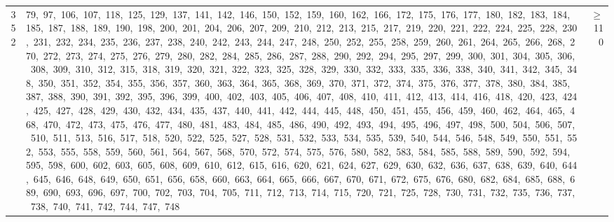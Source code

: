 \begin{longtable}{c|p{}|r}
352 & 79,\ 97,\ 106,\ 107,\ 118,\ 125,\ 129,\ 137,\ 141,\ 142,\ 146,\ 150,\ 152,\ 159,\ 160,\ 162,\ 166,\ 172,\ 175,\ 176,\ 177,\ 180,\ 182,\ 183,\ 184,\ 185,\ 187,\ 188,\ 189,\ 190,\ 198,\ 200,\ 201,\ 204,\ 206,\ 207,\ 209,\ 210,\ 212,\ 213,\ 215,\ 217,\ 219,\ 220,\ 221,\ 222,\ 224,\ 225,\ 228,\ 230,\ 231,\ 232,\ 234,\ 235,\ 236,\ 237,\ 238,\ 240,\ 242,\ 243,\ 244,\ 247,\ 248,\ 250,\ 252,\ 255,\ 258,\ 259,\ 260,\ 261,\ 264,\ 265,\ 266,\ 268,\ 270,\ 272,\ 273,\ 274,\ 275,\ 276,\ 279,\ 280,\ 282,\ 284,\ 285,\ 286,\ 287,\ 288,\ 290,\ 292,\ 294,\ 295,\ 297,\ 299,\ 300,\ 301,\ 304,\ 305,\ 306,\ 308,\ 309,\ 310,\ 312,\ 315,\ 318,\ 319,\ 320,\ 321,\ 322,\ 323,\ 325,\ 328,\ 329,\ 330,\ 332,\ 333,\ 335,\ 336,\ 338,\ 340,\ 341,\ 342,\ 345,\ 348,\ 350,\ 351,\ 352,\ 354,\ 355,\ 356,\ 357,\ 360,\ 363,\ 364,\ 365,\ 368,\ 369,\ 370,\ 371,\ 372,\ 374,\ 375,\ 376,\ 377,\ 378,\ 380,\ 384,\ 385,\ 387,\ 388,\ 390,\ 391,\ 392,\ 395,\ 396,\ 399,\ 400,\ 402,\ 403,\ 405,\ 406,\ 407,\ 408,\ 410,\ 411,\ 412,\ 413,\ 414,\ 416,\ 418,\ 420,\ 423,\ 424,\ 425,\ 427,\ 428,\ 429,\ 430,\ 432,\ 434,\ 435,\ 437,\ 440,\ 441,\ 442,\ 444,\ 445,\ 448,\ 450,\ 451,\ 455,\ 456,\ 459,\ 460,\ 462,\ 464,\ 465,\ 468,\ 470,\ 472,\ 473,\ 475,\ 476,\ 477,\ 480,\ 481,\ 483,\ 484,\ 485,\ 486,\ 490,\ 492,\ 493,\ 494,\ 495,\ 496,\ 497,\ 498,\ 500,\ 504,\ 506,\ 507,\ 510,\ 511,\ 513,\ 516,\ 517,\ 518,\ 520,\ 522,\ 525,\ 527,\ 528,\ 531,\ 532,\ 533,\ 534,\ 535,\ 539,\ 540,\ 544,\ 546,\ 548,\ 549,\ 550,\ 551,\ 552,\ 553,\ 555,\ 558,\ 559,\ 560,\ 561,\ 564,\ 567,\ 568,\ 570,\ 572,\ 574,\ 575,\ 576,\ 580,\ 582,\ 583,\ 584,\ 585,\ 588,\ 589,\ 590,\ 592,\ 594,\ 595,\ 598,\ 600,\ 602,\ 603,\ 605,\ 608,\ 609,\ 610,\ 612,\ 615,\ 616,\ 620,\ 621,\ 624,\ 627,\ 629,\ 630,\ 632,\ 636,\ 637,\ 638,\ 639,\ 640,\ 644,\ 645,\ 646,\ 648,\ 649,\ 650,\ 651,\ 656,\ 658,\ 660,\ 663,\ 664,\ 665,\ 666,\ 667,\ 670,\ 671,\ 672,\ 675,\ 676,\ 680,\ 682,\ 684,\ 685,\ 688,\ 689,\ 690,\ 693,\ 696,\ 697,\ 700,\ 702,\ 703,\ 704,\ 705,\ 711,\ 712,\ 713,\ 714,\ 715,\ 720,\ 721,\ 725,\ 728,\ 730,\ 731,\ 732,\ 735,\ 736,\ 737,\ 738,\ 740,\ 741,\ 742,\ 744,\ 747,\ 748 & $\ge$ 110 \\

\end{longtable}
